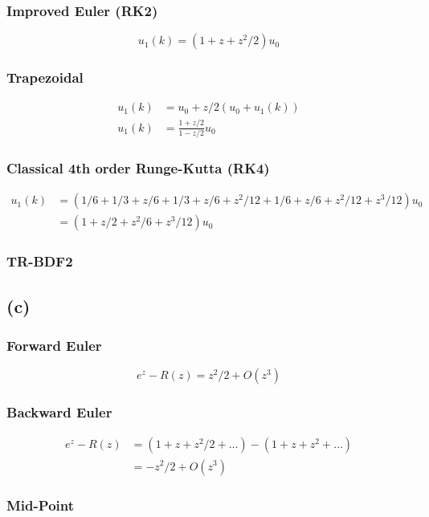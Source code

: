 \documentclass{article}
\begin{document}
\subsubsection*{Improved Euler (RK2)}
\begin{equation}
u_1(k)=(1+z+z^2/2)u_0
\end{equation}

\subsubsection*{Trapezoidal}
\begin{align}
u_1(k)&=u_0+z/2(u_0+u_1(k)) \nonumber\\
u_1(k)&=\frac{1+z/2}{1-z/2}u_0
\end{align}


\subsubsection*{Classical 4th order Runge-Kutta (RK4)}
\begin{align}
u_1(k)&=(1/6+1/3+z/6+1/3+z/6+z^2/12+1/6+z/6+z^2/12+z^3/12)u_0 \nonumber\\
&=(1+z/2+z^2/6+z^3/12)u_0
\end{align}

\subsubsection*{TR-BDF2}

\subsection*{(c)}
\subsubsection*{Forward Euler}
\begin{equation}
e^z-R(z)=z^2/2+O(z^3)
\end{equation}

\subsubsection*{Backward Euler}
\begin{align}
e^z-R(z)&=(1+z+z^2/2+\dots)-(1+z+z^2+\dots) \nonumber\\
&=-z^2/2+O(z^3)
\end{align}

\subsubsection*{Mid-Point}
\end{document}
